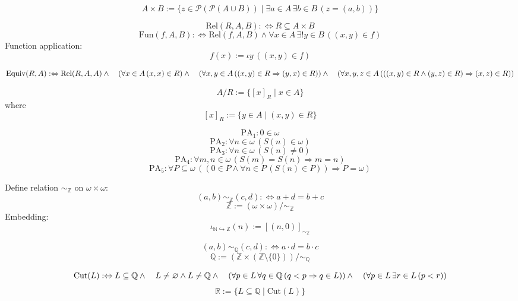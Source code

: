 \documentclass{article}
\begin{document}
\[
A \times B := \{ z \in \mathcal{P}(\mathcal{P}(A \cup B)) \mid \exists a \in A \, \exists b \in B \, (z = (a, b)) \}
\]

\[
\text{Rel}(R, A, B) :\Leftrightarrow R \subseteq A \times B
\]
\[
\text{Fun}(f, A, B) :\Leftrightarrow \text{Rel}(f, A, B) \land \forall x \in A \, \exists! y \in B \, ((x, y) \in f)
\]
Function application:
\[
f(x) := \iota y \, ((x, y) \in f)
\]

\[
\text{Equiv}(R, A) :\Leftrightarrow \text{Rel}(R, A, A) \land \\
\quad (\forall x \in A \, (x, x) \in R) \land \\
\quad (\forall x, y \in A \, ((x, y) \in R \Rightarrow (y, x) \in R)) \land \\
\quad (\forall x, y, z \in A \, (((x, y) \in R \land (y, z) \in R) \Rightarrow (x, z) \in R))
\]

\[
A / R := \{ [x]_R \mid x \in A \}
\]
where
\[
[x]_R := \{ y \in A \mid (x, y) \in R \}
\]

\[
\text{PA}_1: 0 \in \omega
\]
\[
\text{PA}_2: \forall n \in \omega \, (S(n) \in \omega)
\]
\[
\text{PA}_3: \forall n \in \omega \, (S(n) \neq 0)
\]
\[
\text{PA}_4: \forall m, n \in \omega \, (S(m) = S(n) \Rightarrow m = n)
\]
\[
\text{PA}_5: \forall P \subseteq \omega \, ((0 \in P \land \forall n \in P \, (S(n) \in P)) \Rightarrow P = \omega)
\]

Define relation $\sim_{\mathbb{Z}}$ on $\omega \times \omega$:
\[
(a, b) \sim_{\mathbb{Z}} (c, d) :\Leftrightarrow a + d = b + c
\]
\[
\mathbb{Z} := (\omega \times \omega) / \sim_{\mathbb{Z}}
\]
Embedding:
\[
\iota_{\mathbb{N}\hookrightarrow\mathbb{Z}}(n) := [(n, 0)]_{\sim_{\mathbb{Z}}}
\]

\[
(a, b) \sim_{\mathbb{Q}} (c, d) :\Leftrightarrow a \cdot d = b \cdot c
\]
\[
\mathbb{Q} := (\mathbb{Z} \times (\mathbb{Z} \setminus \{0\})) / \sim_{\mathbb{Q}}
\]

\[
\text{Cut}(L) :\Leftrightarrow L \subseteq \mathbb{Q} \land \\
\quad L \neq \varnothing \land L \neq \mathbb{Q} \land \\
\quad (\forall p \in L \, \forall q \in \mathbb{Q} \, (q < p \Rightarrow q \in L)) \land \\
\quad (\forall p \in L \, \exists r \in L \, (p < r))
\]
\[
\mathbb{R} := \{ L \subseteq \mathbb{Q} \mid \text{Cut}(L) \}
\]
\end{document}
